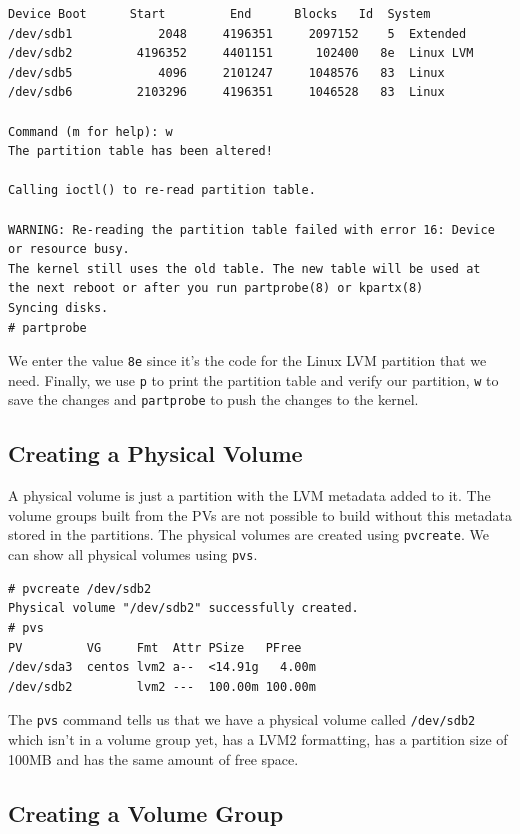 \begin{verbatim}
Device Boot      Start         End      Blocks   Id  System
/dev/sdb1            2048     4196351     2097152    5  Extended
/dev/sdb2         4196352     4401151      102400   8e  Linux LVM
/dev/sdb5            4096     2101247     1048576   83  Linux
/dev/sdb6         2103296     4196351     1046528   83  Linux

Command (m for help): w
The partition table has been altered!

Calling ioctl() to re-read partition table.

WARNING: Re-reading the partition table failed with error 16: Device or resource busy.
The kernel still uses the old table. The new table will be used at
the next reboot or after you run partprobe(8) or kpartx(8)
Syncing disks.
# partprobe
\end{verbatim}
\vspace{-10pt}

\noindent
We enter the value \verb|8e| since it's the code for the Linux LVM partition that we need. Finally, we use \verb|p| to print the partition table and verify our partition, \verb|w| to save the changes and \verb|partprobe| to push the changes to the kernel. 

\subsection{Creating a Physical Volume}
A physical volume is just a partition with the LVM metadata added to it. The volume groups built from the PVs are not possible to build without this metadata stored in the partitions. The physical volumes are created using \verb|pvcreate|. We can show all physical volumes using \verb|pvs|. 

\vspace{-15pt}
\begin{verbatim}
# pvcreate /dev/sdb2
Physical volume "/dev/sdb2" successfully created.
# pvs
PV         VG     Fmt  Attr PSize   PFree  
/dev/sda3  centos lvm2 a--  <14.91g   4.00m
/dev/sdb2         lvm2 ---  100.00m 100.00m
\end{verbatim}
\vspace{-10pt}

\noindent
The \verb|pvs| command tells us that we have a physical volume called \verb|/dev/sdb2| which isn't in a volume group yet, has a LVM2 formatting, has a partition size of 100MB and has the same amount of free space. 

\subsection{Creating a Volume Group}

